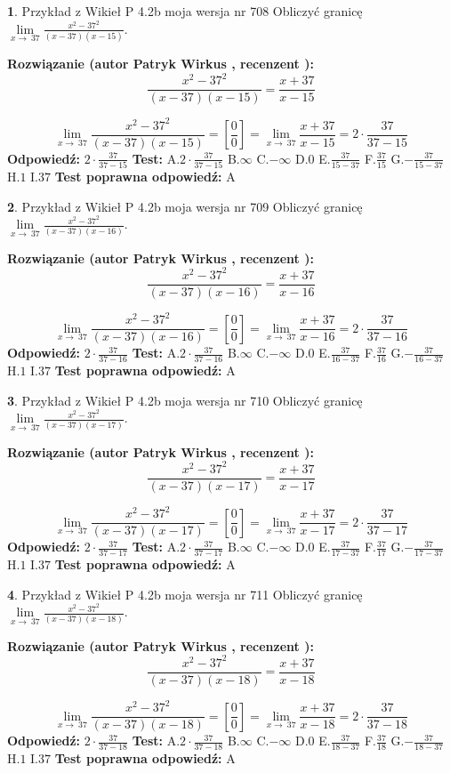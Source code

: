 \documentclass[12pt, a4paper]{article}
\theoremstyle{definition} %
\newtheorem{zad}{}
\newcommand{\zadStart}[1]{\begin{zad}#1\newline}
\newcommand{\zadStop}{\end{zad}}
\newcommand{\rozwStart}[2]{\noindent \textbf{Rozwiązanie (autor #1 , recenzent #2): }\newline}
\newcommand{\rozwStop}{\newline}
\newcommand{\odpStart}{\noindent \textbf{Odpowiedź:}\newline}
\newcommand{\odpStop}{\newline}
\newcommand{\testStart}{\noindent \textbf{Test:}\newline}
\newcommand{\testStop}{\newline}
\newcommand{\kluczStart}{\noindent \textbf{Test poprawna odpowiedź:}\newline}
\newcommand{\kluczStop}{\newline}
\begin{document}
\zadStart{Przykład z Wikieł P 4.2b moja wersja nr 708}
Obliczyć granicę $\lim\limits_{x\to\ 37}\frac{x^{2}-37^{2}}{(x-37)(x-15)}$.
\zadStop
\rozwStart{Patryk Wirkus}{}
$$\frac{x^{2}-37^{2}}{(x-37)(x-15)}=\frac{x+37}{x-15}$$

$$\lim\limits_{x\to\ 37}\frac{x^{2}-37^{2}}{(x-37)(x-15)}=[\frac{0}{0}]=\lim\limits_{x\to\ 37}\frac{x+37}{x-15}=2 \cdot \frac{37}{37-15}$$
\rozwStop
\odpStart
$2 \cdot \frac{37}{37-15}$
\odpStop
\testStart
A.$2 \cdot \frac{37}{37-15}$
B.$\infty$
C.$-\infty$
D.$0$
E.$\frac{37}{15-37}$
F.$\frac{37}{15}$
G.$-\frac{37}{15-37}$
H.$1$
I.$37$
\testStop
\kluczStart
A
\kluczStop



\zadStart{Przykład z Wikieł P 4.2b moja wersja nr 709}
Obliczyć granicę $\lim\limits_{x\to\ 37}\frac{x^{2}-37^{2}}{(x-37)(x-16)}$.
\zadStop
\rozwStart{Patryk Wirkus}{}
$$\frac{x^{2}-37^{2}}{(x-37)(x-16)}=\frac{x+37}{x-16}$$

$$\lim\limits_{x\to\ 37}\frac{x^{2}-37^{2}}{(x-37)(x-16)}=[\frac{0}{0}]=\lim\limits_{x\to\ 37}\frac{x+37}{x-16}=2 \cdot \frac{37}{37-16}$$
\rozwStop
\odpStart
$2 \cdot \frac{37}{37-16}$
\odpStop
\testStart
A.$2 \cdot \frac{37}{37-16}$
B.$\infty$
C.$-\infty$
D.$0$
E.$\frac{37}{16-37}$
F.$\frac{37}{16}$
G.$-\frac{37}{16-37}$
H.$1$
I.$37$
\testStop
\kluczStart
A
\kluczStop



\zadStart{Przykład z Wikieł P 4.2b moja wersja nr 710}
Obliczyć granicę $\lim\limits_{x\to\ 37}\frac{x^{2}-37^{2}}{(x-37)(x-17)}$.
\zadStop
\rozwStart{Patryk Wirkus}{}
$$\frac{x^{2}-37^{2}}{(x-37)(x-17)}=\frac{x+37}{x-17}$$

$$\lim\limits_{x\to\ 37}\frac{x^{2}-37^{2}}{(x-37)(x-17)}=[\frac{0}{0}]=\lim\limits_{x\to\ 37}\frac{x+37}{x-17}=2 \cdot \frac{37}{37-17}$$
\rozwStop
\odpStart
$2 \cdot \frac{37}{37-17}$
\odpStop
\testStart
A.$2 \cdot \frac{37}{37-17}$
B.$\infty$
C.$-\infty$
D.$0$
E.$\frac{37}{17-37}$
F.$\frac{37}{17}$
G.$-\frac{37}{17-37}$
H.$1$
I.$37$
\testStop
\kluczStart
A
\kluczStop



\zadStart{Przykład z Wikieł P 4.2b moja wersja nr 711}
Obliczyć granicę $\lim\limits_{x\to\ 37}\frac{x^{2}-37^{2}}{(x-37)(x-18)}$.
\zadStop
\rozwStart{Patryk Wirkus}{}
$$\frac{x^{2}-37^{2}}{(x-37)(x-18)}=\frac{x+37}{x-18}$$

$$\lim\limits_{x\to\ 37}\frac{x^{2}-37^{2}}{(x-37)(x-18)}=[\frac{0}{0}]=\lim\limits_{x\to\ 37}\frac{x+37}{x-18}=2 \cdot \frac{37}{37-18}$$
\rozwStop
\odpStart
$2 \cdot \frac{37}{37-18}$
\odpStop
\testStart
A.$2 \cdot \frac{37}{37-18}$
B.$\infty$
C.$-\infty$
D.$0$
E.$\frac{37}{18-37}$
F.$\frac{37}{18}$
G.$-\frac{37}{18-37}$
H.$1$
I.$37$
\testStop
\kluczStart
A
\kluczStop
\end{document}
